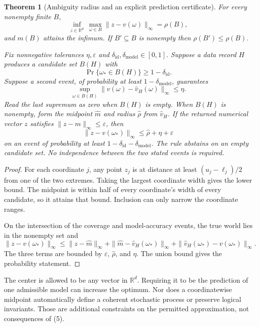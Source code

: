 \documentclass[11pt,letterpaper]{article}
\theoremstyle{plain}
\newtheorem{theorem}{Theorem}[section]
\theoremstyle{definition}
\begin{document}
\begin{theorem}[Ambiguity radius and an explicit prediction certificate]\label{thm:radius}
For every nonempty finite $B$,
\[
\inf_{z\in\mathbb R^d}\ \max_{\omega\in B}\|z-v(\omega)\|_\infty=\rho(B),
\]
and $m(B)$ attains the infimum. If $B'\subseteq B$ is nonempty then $\rho(B')\le\rho(B)$.

Fix nonnegative tolerances $\eta,\varepsilon$ and $\delta_{\mathrm{id}},\delta_{\mathrm{model}}\in[0,1]$. Suppose a data record $H$ produces a candidate set $B(H)$ with
\[
\Pr\{\omega_*\in B(H)\}\ge1-\delta_{\mathrm{id}}.
\]
Suppose a second event, of probability at least $1-\delta_{\mathrm{model}}$, guarantees
\[
\sup_{\omega\in B(H)}\|v(\omega)-\widehat v_H(\omega)\|_\infty\le\eta.
\]
Read the last supremum as zero when $B(H)$ is empty. When $B(H)$ is nonempty, form the midpoint $\widehat m$ and radius $\widehat\rho$ from $\widehat v_H$. If the returned numerical vector $z$ satisfies $\|z-\widehat m\|_\infty\le\varepsilon$, then
\[
\|z-v(\omega_*)\|_\infty\le\widehat\rho+\eta+\varepsilon\tag{6}
\]
on an event of probability at least $1-\delta_{\mathrm{id}}-\delta_{\mathrm{model}}$. The rule abstains on an empty candidate set. No independence between the two stated events is required.
\end{theorem}
\begin{proof}
For each coordinate $j$, any point $z_j$ is at distance at least $(u_j-\ell_j)/2$ from one of the two extremes. Taking the largest coordinate width gives the lower bound. The midpoint is within half of every coordinate's width of every candidate, so it attains that bound. Inclusion can only narrow the coordinate ranges.

On the intersection of the coverage and model-accuracy events, the true world lies in the nonempty set and
\[
\|z-v(\omega_*)\|_\infty
\le\|z-\widehat m\|_\infty
+\|\widehat m-\widehat v_H(\omega_*)\|_\infty
+\|\widehat v_H(\omega_*)-v(\omega_*)\|_\infty.
\]
The three terms are bounded by $\varepsilon$, $\widehat\rho$, and $\eta$. The union bound gives the probability statement.
\end{proof}

The center is allowed to be any vector in $\mathbb R^d$. Requiring it to be the prediction of one admissible model can increase the optimum. Nor does a coordinatewise midpoint automatically define a coherent stochastic process or preserve logical invariants. Those are additional constraints on the permitted approximation, not consequences of (5).
\end{document}
